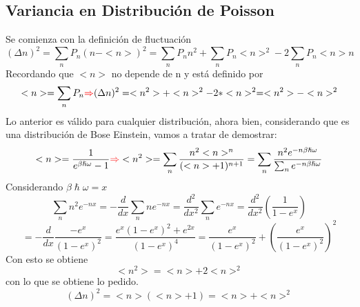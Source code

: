 \documentclass{book}
\begin{document}
\subsection{Variancia en Distribución de Poisson}Se comienza con la definición de fluctuación
\begin{equation}{ (\Delta n)^2=\sum_n P_n (n-<n>)^2= \sum_n P_n n^2+\sum_n P_n <n>^2 -2\sum_n P_n<n> n }\end{equation}
Recordando que $<n>$ no depende de n y está definido por
\begin{equation}{ <n> =\sum_n P_n \textcolor{red}{\Rightarrow} (\Delta n)^2=<n^2>+<n>^2-2*<n>^2=<n^2>-<n>^2}\end{equation}
Lo anterior es válido para cualquier distribución, ahora bien, considerando que es una distribución de Bose Einstein, vamos a tratar de demostrar:
\begin{equation}{ <n>=\frac{1}{e^{\beta\hslash\omega}-1}\textcolor{red}{\Rightarrow} <n^2>=\sum_n \frac{n^2 <n>^n}{(<n>+1)^{n+1}}=\sum_n\frac{n^2 e^{-n\beta\hslash\omega}}{\sum_n e^{-n\beta\hslash\omega}}}\end{equation}
Considerando $\beta\hslash\omega=x$
\begin{equation}{ \sum_n n^2 e^{-nx}= -\frac{d}{dx} \sum_n n e^{-nx}= \frac{d^2}{dx^2} \sum_n e^{-nx}=\frac{d^2}{dx^2}(\frac{1}{1-e^{x}})}\end{equation} \begin{equation}{=-\frac{d}{dx}\frac{-e^{x}}{(1-e^{x})^2}=\frac{e^x(1-e^x)^2+e^{2x}}{(1-e^x)^4}=\frac{e^x}{(1-e^x)^2}+(\frac{e^x}{(1-e^x)^2})^2}\end{equation}
Con esto se obtiene \begin{equation}{ <n^2>=<n> +2<n>^2}\end{equation}
con lo que se obtiene lo pedido. \begin{equation}{ (\Delta n)^2=<n>(<n>+1)=<n>+<n>^2}\end{equation} 
\end{document}
